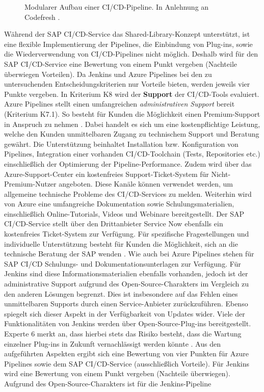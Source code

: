 \begin{center}
	\begin{figure}[H]
		\centering
		\caption[Modularer Aufbau einer CI/CD-Pipeline]{Modularer Aufbau einer CI/CD-Pipeline. In Anlehnung an Codefresh \cite{.20230402}.}
		\label{fig:Modular}
	\end{figure}
\end{center}
\vspace*{-15mm}
Während der SAP CI/CD-Service das Shared-Library-Konzept unterstützt, ist eine flexible Implementierung der Pipelines, die Einbindung von Plug-ins, sowie die Wiederverwendung von CI/CD-Pipelines nicht möglich. Deshalb wird für den SAP CI/CD-Service eine Bewertung von einem Punkt vergeben (Nachteile überwiegen Vorteilen). Da Jenkins und Azure Pipelines bei den zu untersuchenden Entscheidungskriterien nur Vorteile bieten, werden jeweils vier Punkte vergeben. In Kriterium K8 wird der \textbf{Support} der CI/CD-Tools evaluiert. Azure Pipelines stellt einen umfangreichen \textit{administrativen Support} bereit (Kriterium K7.1). So besteht für Kunden die Möglichkeit einen Premium-Support in Anspruch zu nehmen \cite{.20230410e}. Dabei handelt es sich um eine kostenpflichtige Leistung, welche den Kunden unmittelbaren Zugang zu technischem Support und Beratung gewährt. Die Unterstützung beinhaltet Installation bzw. Konfiguration von Pipelines, Integration einer vorhanden CI/CD-Toolchain (Tests, Repositories etc.) einschließlich der Optimierung der Pipeline-Performance. Zudem wird über das Azure-Support-Center ein kostenfreies Support-Ticket-System für Nicht-Premium-Nutzer angeboten. Diese Kanäle können verwendet werden, um allgemeine technische Probleme des CI/CD-Services zu melden. Weiterhin wird von Azure eine umfangreiche Dokumentation sowie Schulungsmaterialien, einschließlich Online-Tutorials, Videos und Webinare bereitgestellt. Der SAP CI/CD-Service stellt über den Drittanbieter Service Now ebenfalls ein kostenfreies Ticket-System zur Verfügung. Für spezifische Fragestellungen und individuelle Unterstützung besteht für Kunden die Möglichkeit, sich an die technische Beratung der SAP wenden \cite[Z. 109 ff.]{ProductOwnerSAPBTPProd&Infra.}. Wie auch bei Azure Pipelines stehen für SAP CI/CD Schulungs- und Dokumentationsunterlagen zur Verfügung. Für Jenkins sind diese Informationsmaterialien ebenfalls vorhanden, jedoch ist der administrative Support aufgrund des Open-Source-Charakters im Vergleich zu den anderen Lösungen begrenzt. Dies ist insbesondere auf das Fehlen eines unmittelbaren Supports durch einen Service-Anbieter zurückzuführen. Ebenso spiegelt sich dieser Aspekt in der Verfügbarkeit von Updates wider. Viele der Funktionalitäten von Jenkins werden über Open-Source-Plug-ins bereitgestellt. Experte 6 merkt an, dass hierbei stets das Risiko besteht, dass die Wartung einzelner Plug-ins in Zukunft vernachlässigt werden könnte \cite[Z.30]{FullStackEntwicklerSAPDTSIntegration.}. Aus den aufgeführten Aspekten ergibt sich eine Bewertung von vier Punkten für Azure Pipelines sowie dem SAP CI/CD-Service (ausschließlich Vorteile). Für Jenkins wird eine Bewertung von einem Punkt vergeben (Nachteile überwiegen). Aufgrund des Open-Source-Charakters ist für die Jenkins-Pipeline 